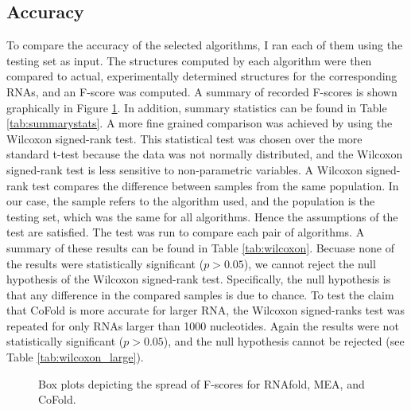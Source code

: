 \documentclass[12pt, a4paper]{article}
\begin{document}
\subsection{Accuracy}
To compare the accuracy of the selected algorithms, I ran each of them using the testing set as input. The structures computed by each algorithm were then compared to actual, experimentally determined structures for the corresponding RNAs, and an F-score was computed. A summary of recorded F-scores is shown graphically in Figure \ref{fig:boxplots}. In addition, summary statistics can be found in Table \ref{tab:summarystats}. A more fine grained comparison was achieved by using the Wilcoxon signed-rank test. This statistical test was chosen over the more standard t-test because the data was not normally distributed, and the Wilcoxon signed-rank test is less sensitive to non-parametric variables. A Wilcoxon signed-rank test compares the difference between samples from the same population. In our case, the sample refers to the algorithm used, and the population is the testing set, which was the same for all algorithms. Hence the assumptions of the test are satisfied. The test was run to compare each pair of algorithms. A summary of these results can be found in Table \ref{tab:wilcoxon}. Becuase none of the results were statistically significant ($p > 0.05$), we cannot reject the null hypothesis of the Wilcoxon signed-rank test. Specifically, the null hypothesis is that any difference in the compared samples is due to chance. To test the claim that CoFold is more accurate for larger RNA, the Wilcoxon signed-ranks test was repeated for only RNAs larger than 1000 nucleotides. Again the results were not statistically significant ($p > 0.05$), and the null hypothesis cannot be rejected (see Table \ref{tab:wilcoxon_large}).

\begin{figure}
\begin{center}
\end{center}
\caption{Box plots depicting the spread of F-scores for RNAfold, MEA, and CoFold.}
\label{fig:boxplots}
\end{figure}
\end{document}
